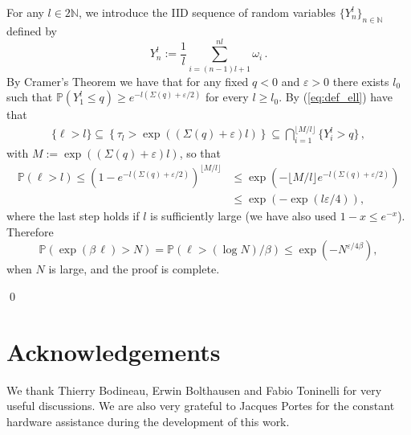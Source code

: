 \documentclass[reqno,11pt]{amsart}
\numberwithin{equation}{section}
\newcommand{\N}{\mathbb{N}}
\DeclareMathOperator*{\inter}{\bigcap}       %
\newcommand{\bbP}{{\ensuremath{\mathbb P}} }
\newcommand{\gb}{\beta}
\newcommand{\gep}{\varepsilon}       %
\newcommand{\go}{\omega}
\newcommand{\gS}{\Sigma}
\begin{document}
For any $l\in2\N$, we introduce the IID sequence of random variables $\{Y_n^{l}\}_{n\in\N}$ defined by
\begin{equation}
Y^{l}_n := \frac 1 {l}{\sum_{i=(n-1)l+1}^{n l} \go_i}\,.
\end{equation}
By Cramer's Theorem \cite{cf:DZ} we have that for any fixed $q<0$ and $ \gep>0$ there exists  $l_0$ such that $\bbP\left(Y_1^{l} \le q\right) \ge e^{-l (\gS(q) + \gep/2)}$ for every $l\ge l_0$.
By (\ref{eq:def_ell}) have that
\begin{equation}
\begin{split}
\{\ell > l\} \subseteq \left\{\tau_l > \exp((\gS(q)+\gep) l)\right\}
\subseteq \inter_{i=1}^{\lfloor M/l \rfloor} \{Y_i^{l} > q\}\,,
\end{split}\end{equation}
with $M:=\exp((\gS(q)+\gep) l)$, so that
\begin{equation}
\begin{split}
\bbP\left(\ell > l\right)
  \le \left( 1- e^{-l (\gS(q) + \gep/2)} \right)^{\lfloor M/l \rfloor}
  &\le
  \exp \left( - \lfloor M/l \rfloor e^{-l (\gS(q) + \gep/2)} \right)
  \\
& \le  \exp \left(- \exp\left(l \gep/4\right)\right),
\end{split}
\end{equation}
where the last step holds if $l$ is sufficiently large   (we have also used
 $1-x \le e^{-x}$). Therefore
\begin{equation}
\bbP\left(\exp(\gb\,\ell) > N\right) = \bbP\left(\ell > (\log N) /\gb \right)
\le  \exp \left( - N ^{\gep / 4\gb }\right),
\end{equation}
when $N$ is large, and the proof is complete.

\qed


\bigskip



\section*{Acknowledgements}

We thank Thierry Bodineau, Erwin Bolthausen and Fabio Toninelli 
 for very useful discussions.
We are also very grateful to Jacques Portes for the constant hardware assistance
during the development of this work.


\end{document}
